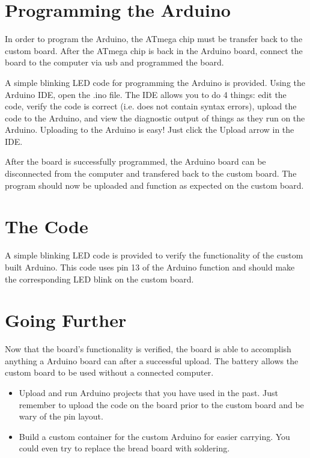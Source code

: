 \documentclass[11pt]{article}
\begin{document}
\section{Programming the Arduino}
\label{sec-4}
In order to program the Arduino, the ATmega chip must be transfer back to the custom board. After the ATmega chip is back in the Arduino board, connect the board to the computer via usb and programmed the board. 

A simple blinking LED code for programming the Arduino is provided. Using the Arduino IDE, open the .ino file.
The IDE allows you to do 4 things: edit the code, verify the code is correct (i.e. does not contain
syntax errors), upload the code to the Arduino, and view the diagnostic output of things as they run on
the Arduino.
Uploading to the Arduino is easy! Just click the Upload arrow in the IDE. 

After the board is successfully programmed, the Arduino board can be disconnected from the computer and transfered back to the custom board. The program should now be uploaded and function as expected on the custom board.

\section{The Code}
\label{sec-5}
A simple blinking LED code is provided to verify the functionality of the custom built Arduino. This code uses pin 13 of the Arduino function and should make the corresponding LED blink on the custom board. 

\section{Going Further}
\label{sec-6}
Now that the board's functionality is verified, the board is able to accomplish anything a Arduino board can after a successful upload. The battery allows the custom board to be used without a connected computer. 

\begin{itemize}
	\item Upload and run Arduino projects that you have used in the past. Just remember to upload the code on the board prior to the custom board and be wary of the pin layout. 
	
	\item Build a custom container for the custom Arduino for easier carrying. You could even try to replace the bread board with soldering. 
\end{itemize}
\end{document}
